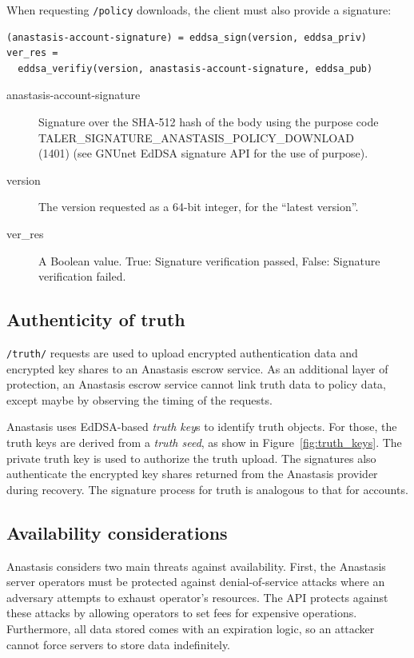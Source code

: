 \noindent
When requesting \texttt{/policy} downloads, the client must also provide a signature:
\begin{lstlisting}
(anastasis-account-signature) = eddsa_sign(version, eddsa_priv)
ver_res =
  eddsa_verifiy(version, anastasis-account-signature, eddsa_pub)
\end{lstlisting}

\begin{description}
	\item[anastasis-account-signature] {Signature over the SHA-512 hash of the body using the purpose code TALER\_SIGNATURE\_ANASTASIS\_POLICY\_DOWNLOAD  \\
	(1401) (see GNUnet EdDSA signature API for the use of purpose).}
	\item[version] {The version requested as a 64-bit integer, for the “latest version”.}
	\item[ver\_res] {A Boolean value. True: Signature verification passed, False: Signature verification failed.}
\end{description}


\subsection{Authenticity of truth} \label{sec:truth}

\texttt{/truth/} requests are used to upload encrypted authentication data
and encrypted key shares to an Anastasis escrow service.  As an additional
layer of protection, an Anastasis escrow service cannot link truth data to
policy data, except maybe by observing the timing of the requests.

Anastasis uses EdDSA-based {\em truth key}s to identify truth
objects. For those, the truth keys are derived from a {\em truth
  seed}, as show in Figure~\ref{fig:truth_keys}.  The private truth
key is used to authorize the truth upload. The signatures also
authenticate the encrypted key shares returned from the Anastasis
provider during recovery.  The signature process for truth is
analogous to that for accounts.


\subsection{Availability considerations}

Anastasis considers two main threats against availability. First, the
Anastasis server operators must be protected against denial-of-service
attacks where an adversary attempts to exhaust operator’s
resources. The API protects against these attacks by allowing
operators to set fees for expensive operations. Furthermore, all data stored
comes with an expiration logic, so an attacker cannot force servers to
store data indefinitely.


